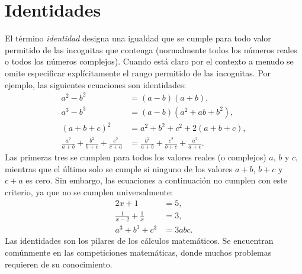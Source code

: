 \section{Identidades}

El término \textit{identidad} designa una igualdad que se cumple para todo valor permitido de las incognitas que contenga (normalmente todos los números reales o todos los números complejos).
Cuando está claro por el contexto a menudo se omite especificar explícitamente el rango permitido de las incognitas.
Por ejemplo, las siguientes ecuaciones son identidades:
\begin{align*}
    a^2 - b^2 &= (a - b)(a + b),\\
    a^3 - b^3 &= (a - b)(a^2 + ab + b^2),\\
    (a + b + c)^2 &= a^2 + b^2 + c^2 + 2(a + b + c),\\
    \frac{a^2}{a + b} + \frac{b^2}{b + c} + \frac{c^2}{c + a} &= \frac{b^2}{a + b} + \frac{c^2}{b + c} + \frac{a^2}{a + c}.
\end{align*}
Las primeras tres se cumplen para todos los valores reales (o complejos) $a$, $b$ y $c$, mientras que el último solo se cumple si ninguno de los valores $a + b$, $b + c$ y $c + a$ es cero.
Sin embargo, las ecuaciones a continuación no cumplen con este criterio, ya que no se cumplen universalmente:
\begin{align*}
    2x + 1 &= 5,\\
    \frac{1}{x - 2} + \frac{1}{x} &= 3,\\
    a^3 + b^3 + c^3 &= 3abc.
\end{align*}
Las identidades son los pilares de los cálculos matemáticos.
Se encuentran comúnmente en las competiciones matemáticas, donde muchos problemas requieren de su conocimiento.

